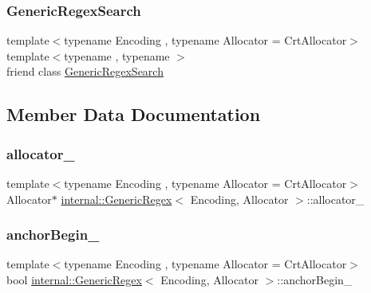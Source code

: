 \subsubsection{\texorpdfstring{Generic\+Regex\+Search}{GenericRegexSearch}}
{\footnotesize\ttfamily template$<$typename Encoding , typename Allocator  = Crt\+Allocator$>$ \\
template$<$typename , typename $>$ \\
friend class \hyperlink{classinternal_1_1GenericRegexSearch}{Generic\+Regex\+Search}\hspace{0.3cm}{\ttfamily [friend]}}



\subsection{Member Data Documentation}
\mbox{\label{classinternal_1_1GenericRegex_a2fb2543ae1c5ec68f891745fa69af0e3}} 
\subsubsection{\texorpdfstring{allocator\+\_\+}{allocator\_}}
{\footnotesize\ttfamily template$<$typename Encoding , typename Allocator  = Crt\+Allocator$>$ \\
Allocator$\ast$ \hyperlink{classinternal_1_1GenericRegex}{internal\+::\+Generic\+Regex}$<$ Encoding, Allocator $>$\+::allocator\+\_\+\hspace{0.3cm}{\ttfamily [private]}}

\mbox{\label{classinternal_1_1GenericRegex_ac99b045cc5250649ea3708bee95a56e8}} 
\subsubsection{\texorpdfstring{anchor\+Begin\+\_\+}{anchorBegin\_}}
{\footnotesize\ttfamily template$<$typename Encoding , typename Allocator  = Crt\+Allocator$>$ \\
bool \hyperlink{classinternal_1_1GenericRegex}{internal\+::\+Generic\+Regex}$<$ Encoding, Allocator $>$\+::anchor\+Begin\+\_\+\hspace{0.3cm}{\ttfamily [private]}}

